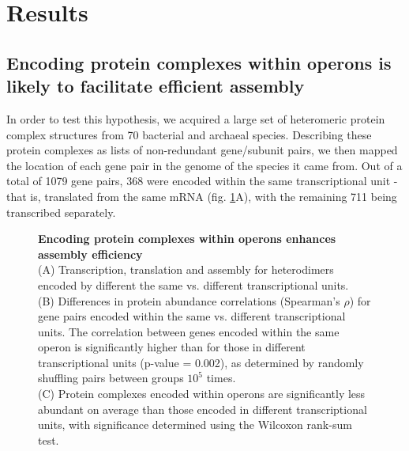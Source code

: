 \documentclass[a4paper,11pt,twoside,openright]{scrbook}
\begin{document}
\section{Results}
\subsection{Encoding protein complexes within operons is likely to facilitate efficient assembly}
In order to test this hypothesis, we acquired a large set of heteromeric protein complex structures from 70 bacterial and archaeal species. Describing these protein complexes as lists of non-redundant gene/subunit pairs, we then mapped the location of each gene pair in the genome of the species it came from. Out of a total of 1079 gene pairs, 368 were encoded within the same transcriptional unit - that is, translated from the same mRNA (fig. \ref{figure:operonabundance}A), with the remaining 711 being transcribed separately.

\begin{figure}
    \caption[Encoding protein complexes within operons enhances assembly efficiency]{\sffamily \textbf{Encoding protein complexes within operons enhances assembly efficiency} \\ \small (A) Transcription, translation and assembly for heterodimers encoded by different the same vs. different transcriptional units.\\
    (B) Differences in protein abundance correlations (Spearman's \(\rho\)) for gene pairs encoded within the same vs. different transcriptional units. The correlation between genes encoded within the same operon is significantly higher than for those in different transcriptional units (p-value = 0.002), as determined by randomly shuffling pairs between groups \(10^{5}\) times.\\
    (C) Protein complexes encoded within operons are significantly less abundant on average than those encoded in different transcriptional units, with significance determined using the Wilcoxon rank-sum test.}
    \label{figure:operonabundance}
\end{figure}
\end{document}
